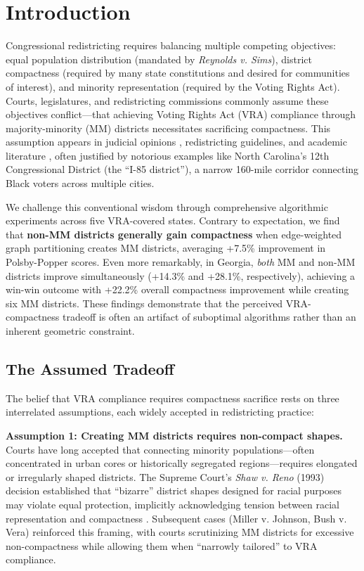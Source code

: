 
\section{Introduction}

Congressional redistricting requires balancing multiple competing objectives: equal population distribution (mandated by \emph{Reynolds v. Sims}), district compactness (required by many state constitutions and desired for communities of interest), and minority representation (required by the Voting Rights Act). Courts, legislatures, and redistricting commissions commonly assume these objectives conflict---that achieving Voting Rights Act (VRA) compliance through majority-minority (MM) districts necessitates sacrificing compactness. This assumption appears in judicial opinions \citep{shaw1993}, redistricting guidelines, and academic literature \citep{pildes1993}, often justified by notorious examples like North Carolina's 12th Congressional District (the ``I-85 district''), a narrow 160-mile corridor connecting Black voters across multiple cities.

We challenge this conventional wisdom through comprehensive algorithmic experiments across five VRA-covered states. Contrary to expectation, we find that \textbf{non-MM districts generally gain compactness} when edge-weighted graph partitioning creates MM districts, averaging +7.5\% improvement in Polsby-Popper scores. Even more remarkably, in Georgia, \emph{both} MM and non-MM districts improve simultaneously (+14.3\% and +28.1\%, respectively), achieving a win-win outcome with +22.2\% overall compactness improvement while creating six MM districts. These findings demonstrate that the perceived VRA-compactness tradeoff is often an artifact of suboptimal algorithms rather than an inherent geometric constraint.

\subsection{The Assumed Tradeoff}

The belief that VRA compliance requires compactness sacrifice rests on three interrelated assumptions, each widely accepted in redistricting practice:

\textbf{Assumption 1: Creating MM districts requires non-compact shapes.} Courts have long accepted that connecting minority populations---often concentrated in urban cores or historically segregated regions---requires elongated or irregularly shaped districts. The Supreme Court's \emph{Shaw v. Reno} (1993) decision established that ``bizarre'' district shapes designed for racial purposes may violate equal protection, implicitly acknowledging tension between racial representation and compactness \citep{shaw1993}. Subsequent cases (Miller v. Johnson, Bush v. Vera) reinforced this framing, with courts scrutinizing MM districts for excessive non-compactness while allowing them when ``narrowly tailored'' to VRA compliance.

